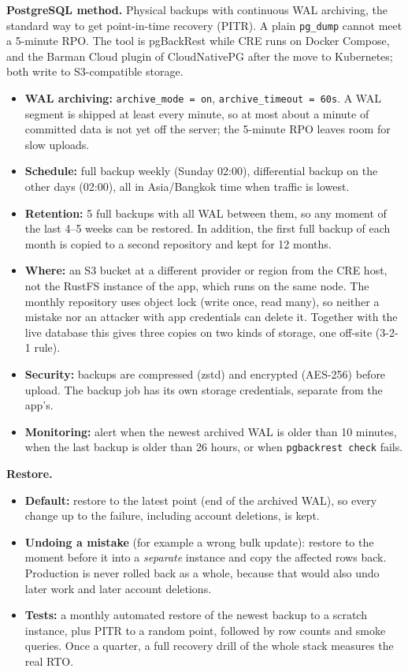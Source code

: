 \documentclass[11pt,a4paper]{article}
\newcommand{\tb}[1]{\texttt{#1}}
\begin{document}
\noindent\textbf{PostgreSQL method.} Physical backups with continuous WAL archiving, the standard way to get point-in-time recovery (PITR). A plain \tb{pg\_dump} cannot meet a 5-minute RPO. The tool is pgBackRest while CRE runs on Docker Compose, and the Barman Cloud plugin of CloudNativePG after the move to Kubernetes; both write to S3-compatible storage.
\begin{itemize}
\item \textbf{WAL archiving:} \tb{archive\_mode = on}, \tb{archive\_timeout = 60s}. A WAL segment is shipped at least every minute, so at most about a minute of committed data is not yet off the server; the 5-minute RPO leaves room for slow uploads.
\item \textbf{Schedule:} full backup weekly (Sunday 02:00), differential backup on the other days (02:00), all in Asia/Bangkok time when traffic is lowest.
\item \textbf{Retention:} 5 full backups with all WAL between them, so any moment of the last 4--5 weeks can be restored. In addition, the first full backup of each month is copied to a second repository and kept for 12 months.
\item \textbf{Where:} an S3 bucket at a different provider or region from the CRE host, not the RustFS instance of the app, which runs on the same node. The monthly repository uses object lock (write once, read many), so neither a mistake nor an attacker with app credentials can delete it. Together with the live database this gives three copies on two kinds of storage, one off-site (3-2-1 rule).
\item \textbf{Security:} backups are compressed (zstd) and encrypted (AES-256) before upload. The backup job has its own storage credentials, separate from the app's.
\item \textbf{Monitoring:} alert when the newest archived WAL is older than 10 minutes, when the last backup is older than 26 hours, or when \tb{pgbackrest check} fails.
\end{itemize}

\noindent\textbf{Restore.}
\begin{itemize}
\item \textbf{Default:} restore to the latest point (end of the archived WAL), so every change up to the failure, including account deletions, is kept.
\item \textbf{Undoing a mistake} (for example a wrong bulk update): restore to the moment before it into a \emph{separate} instance and copy the affected rows back. Production is never rolled back as a whole, because that would also undo later work and later account deletions.
\item \textbf{Tests:} a monthly automated restore of the newest backup to a scratch instance, plus PITR to a random point, followed by row counts and smoke queries. Once a quarter, a full recovery drill of the whole stack measures the real RTO.
\end{itemize}
\end{document}
